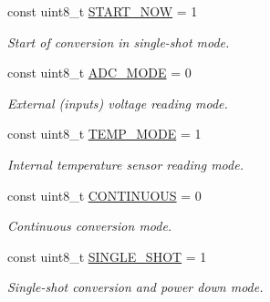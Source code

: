\begin{DoxyCompactItemize}
\mbox{\label{class_a_d_s1118_af146984531345834e8caaf0ffe017735}} 
const uint8\+\_\+t \mbox{\hyperlink{class_a_d_s1118_af146984531345834e8caaf0ffe017735}{S\+T\+A\+R\+T\+\_\+\+N\+OW}} = 1
\begin{DoxyCompactList}\small\item\em Start of conversion in single-\/shot mode. \end{DoxyCompactList}\item 
\mbox{\label{class_a_d_s1118_ace81e16e9c09d65487c451dbc0c86cc5}} 
const uint8\+\_\+t \mbox{\hyperlink{class_a_d_s1118_ace81e16e9c09d65487c451dbc0c86cc5}{A\+D\+C\+\_\+\+M\+O\+DE}} = 0
\begin{DoxyCompactList}\small\item\em External (inputs) voltage reading mode. \end{DoxyCompactList}\item 
\mbox{\label{class_a_d_s1118_aae519c1c967c59c8d40e06f7517fca0c}} 
const uint8\+\_\+t \mbox{\hyperlink{class_a_d_s1118_aae519c1c967c59c8d40e06f7517fca0c}{T\+E\+M\+P\+\_\+\+M\+O\+DE}} = 1
\begin{DoxyCompactList}\small\item\em Internal temperature sensor reading mode. \end{DoxyCompactList}\item 
\mbox{\label{class_a_d_s1118_ac79cd7f4808c3b4ff2721e2e8b6140ba}} 
const uint8\+\_\+t \mbox{\hyperlink{class_a_d_s1118_ac79cd7f4808c3b4ff2721e2e8b6140ba}{C\+O\+N\+T\+I\+N\+U\+O\+US}} = 0
\begin{DoxyCompactList}\small\item\em Continuous conversion mode. \end{DoxyCompactList}\item 
\mbox{\label{class_a_d_s1118_a71a3c608158cd617c24b51986f2fccc0}} 
const uint8\+\_\+t \mbox{\hyperlink{class_a_d_s1118_a71a3c608158cd617c24b51986f2fccc0}{S\+I\+N\+G\+L\+E\+\_\+\+S\+H\+OT}} = 1
\begin{DoxyCompactList}\small\item\em Single-\/shot conversion and power down mode. \end{DoxyCompactList}\item 
\mbox{\label{class_a_d_s1118_ab5035f17d58adff567e8002d3e5c40fa}} 

\end{DoxyCompactItemize}
